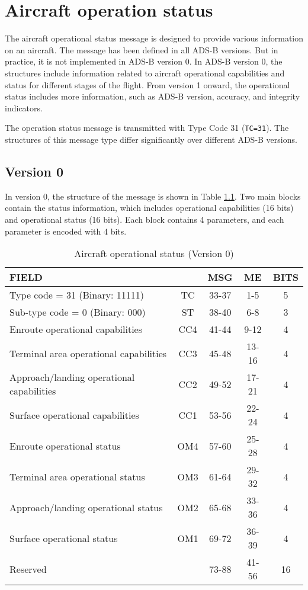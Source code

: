 \chapter{Aircraft operation status}\label{aircraft-operation-status}

The aircraft operational status message is designed to provide various information on an aircraft. The message has been defined in all ADS-B versions. But in practice, it is not implemented in ADS-B version 0. In ADS-B version 0, the structures include information related to aircraft operational capabilities and status for different stages of the flight. From version 1 onward, the operational status includes more information, such as ADS-B version, accuracy, and integrity indicators.

The operation status message is transmitted with Type Code 31 (\texttt{TC=31}). The structures of this message type differ significantly over different ADS-B versions.

\section{Version 0}

In version 0, the structure of the message is shown in Table \ref{tb:adsb-operational-status-v0}. Two main blocks contain the status information, which includes operational capabilities (16 bits) and operational status (16 bits). Each block contains 4 parameters, and each parameter is encoded with 4 bits.

\begin{table}[ht]
\caption{Aircraft operational status (Version 0)}
\label{tb:adsb-operational-status-v0}
\footnotesize
\begin{tabular}{|l|c|c|c|c|}
\hline
\textbf{FIELD} &  & \textbf{MSG} & \textbf{ME} & \textbf{BITS} \\ \hline
Type code = 31 (Binary: 11111) & TC & 33-37 & 1-5 & 5 \\ \hline
Sub-type code = 0 (Binary: 000) & ST & 38-40 & 6-8 & 3 \\ \hline
Enroute operational capabilities & CC4 & 41-44 & 9-12 & 4\\
Terminal area operational capabilities & CC3 & 45-48 & 13-16 & 4\\
Approach/landing operational capabilities & CC2 & 49-52 & 17-21 & 4\\
Surface operational capabilities & CC1 & 53-56 & 22-24 & 4 \\ \hline
Enroute operational status & OM4 & 57-60 & 25-28 & 4\\
Terminal area operational status & OM3 & 61-64 & 29-32 & 4\\
Approach/landing operational status & OM2 & 65-68 & 33-36 & 4 \\
Surface operational status  & OM1 & 69-72 & 36-39 & 4\\ \hline
Reserved & & 73-88 & 41-56 & 16 \\ \hline
\end{tabular}
\end{table}


